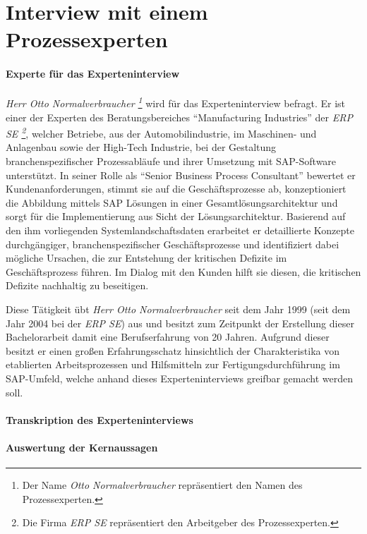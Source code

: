 \section*{Interview mit einem Prozessexperten}

\paragraph{Experte für das Experteninterview}
\textit{Herr Otto Normalverbraucher \footnote{Der Name \textit{Otto Normalverbraucher} repräsentiert den Namen des Prozessexperten.}} wird für das Experteninterview befragt.
Er ist einer der Experten des Beratungsbereiches \enquote{Manufacturing Industries} der \textit{ERP SE \footnote{Die Firma \textit{ERP SE} repräsentiert den Arbeitgeber des Prozessexperten.}}, welcher Betriebe, aus der Automobilindustrie, im Maschinen- und Anlagenbau sowie der High-Tech Industrie, bei der Gestaltung branchenspezifischer Prozessabläufe und ihrer Umsetzung mit SAP-Software unterstützt.
In seiner Rolle als \enquote{Senior Business Process Consultant} bewertet er Kundenanforderungen, stimmt sie auf die Geschäftsprozesse ab, konzeptioniert die Abbildung mittels SAP Lösungen in einer Gesamtlösungsarchitektur und sorgt für die Implementierung aus Sicht der Lösungsarchitektur.
Basierend auf den ihm vorliegenden Systemlandschaftsdaten erarbeitet er detaillierte Konzepte durchgängiger, branchenspezifischer Geschäftsprozesse und identifiziert dabei mögliche Ursachen, die zur Entstehung der kritischen Defizite im Geschäftsprozess führen.
Im Dialog mit den Kunden hilft sie diesen, die kritischen Defizite nachhaltig zu beseitigen. 
 
Diese Tätigkeit übt \textit{Herr Otto Normalverbraucher} seit dem Jahr 1999 (seit dem Jahr 2004 bei der \textit{ERP SE}) aus und besitzt zum Zeitpunkt der Erstellung dieser Bachelorarbeit damit eine Berufserfahrung von 20 Jahren.
Aufgrund dieser besitzt er einen großen Erfahrungsschatz hinsichtlich der Charakteristika von etablierten Arbeitsprozessen und Hilfsmitteln zur Fertigungsdurchführung im SAP-Umfeld, welche anhand dieses Experteninterviews greifbar gemacht werden soll.

\paragraph{Transkription des Experteninterviews}
\paragraph{Auswertung der Kernaussagen}